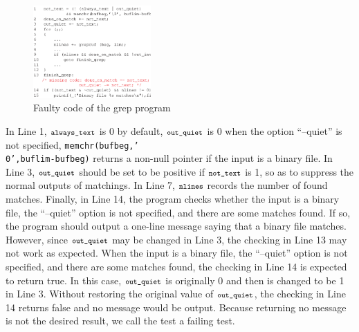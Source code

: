 \documentclass{sig-alternate}
\newcommand{\CodeIn}[1]{{\small\texttt{#1}}}
\begin{document}
\begin{figure}[t]
\begin{center}
  \includegraphics[angle=0,width=0.4\textwidth]{figs/example11.eps}
  \centering
  \caption{Faulty code of the grep program}
  \label{fig:example1}
\end{center} \vspace{-0.2in}
\end{figure}



In Line 1, $\CodeIn{always\_text}$ is 0 by default,
$\CodeIn{out\_quiet}$ is 0 when the option ``--quiet'' is not
specified, \CodeIn{memchr(bufbeg,'\\0',buflim-bufbeg)} returns a
non-null pointer if the input is a binary file. In Line 3,
$\CodeIn{out\_quiet}$ should be set to be positive if
$\CodeIn{not\_text}$ is 1, so as to suppress the normal outputs of
matchings. In Line 7, $\CodeIn{nlines}$ records the number of found
matches. Finally, in Line 14, the program checks whether the input
is a binary file, the ``--quiet'' option is not specified, and there
are some matches found. If so, the program should output a one-line
message saying that a binary file matches. However, since
$\CodeIn{out\_quiet}$ may be changed in Line 3, the checking in Line
13 may not work as expected. When the input is a binary file, the
``--quiet'' option is not specified, and there are some matches
found, the checking in Line 14 is expected to return true. In this
case, $\CodeIn{out\_quiet}$ is originally 0 and then is changed to
be 1 in Line 3. Without restoring the original value of
$\CodeIn{out\_quiet}$, the checking in Line 14 returns false and no
message would be output. Because returning no message is not the
desired result, we call the test a failing test.
\end{document}
